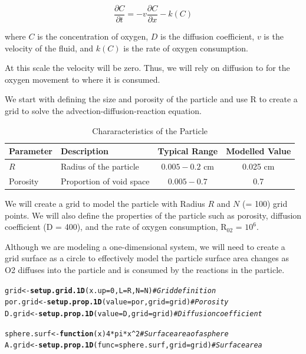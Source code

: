 \documentclass{tufte-handout}\usepackage[]{graphicx}\usepackage[]{xcolor}
\makeatletter
\newcommand{\hlnum}[1]{\textcolor[rgb]{0.686,0.059,0.569}{#1}}%
\newcommand{\hlcom}[1]{\textcolor[rgb]{0.678,0.584,0.686}{\textit{#1}}}%
\newcommand{\hlopt}[1]{\textcolor[rgb]{0,0,0}{#1}}%
\newcommand{\hlstd}[1]{\textcolor[rgb]{0.345,0.345,0.345}{#1}}%
\newcommand{\hlkwa}[1]{\textcolor[rgb]{0.161,0.373,0.58}{\textbf{#1}}}%
\newcommand{\hlkwb}[1]{\textcolor[rgb]{0.69,0.353,0.396}{#1}}%
\newcommand{\hlkwc}[1]{\textcolor[rgb]{0.333,0.667,0.333}{#1}}%
\newcommand{\hlkwd}[1]{\textcolor[rgb]{0.737,0.353,0.396}{\textbf{#1}}}%
\newenvironment{kframe}{%
 \def\at@end@of@kframe{}%
 \ifinner\ifhmode%
  \def\at@end@of@kframe{\end{minipage}}%
  \begin{minipage}{\columnwidth}%
 \fi\fi%
 \def\FrameCommand##1{\hskip\@totalleftmargin \hskip-\fboxsep
 \colorbox{shadecolor}{##1}\hskip-\fboxsep
     \hskip-\linewidth \hskip-\@totalleftmargin \hskip\columnwidth}%
 \MakeFramed {\advance\hsize-\width
   \@totalleftmargin\z@ \linewidth\hsize
   \@setminipage}}%
 {\par\unskip\endMakeFramed%
 \at@end@of@kframe}
\newenvironment{knitrout}{}{} %
\makeatother
\begin{document}
\[ \frac{\partial C}{\partial t} = -v \frac{\partial C}{\partial x} - k(C) \]

where \( C \) is the concentration of oxygen, \( D \) is the diffusion coefficient, \( v \) is the velocity of the fluid, and \( k(C) \) is the rate of oxygen consumption.

At this scale the velocity will be zero. Thus, we will rely on diffusion to for the oxygen movement to where it is consumed. 



We start with defining the size and porosity of the particle and use R to create a grid to solve the advection-diffusion-reaction equation.

\begin{table}[h]
\caption{Chararacteristics of the Particle}
\centering
\begin{tabular}{|l|l|c|c|} \hline
Parameter & Description & Typical Range &  Modelled Value \\ \hline\hline
\( R \) & Radius of the particle & \( 0.005-0.2 \) cm &  0.025 cm \\
Porosity & Proportion of void space & \(0.005-0.7\) &  0.7 \\ \hline
\end{tabular}
\end{table}

We will create a grid to model the particle with Radius \( R \) and \( N \) (= 100) grid points. We will also define the properties of the particle such as porosity, diffusion coefficient (D = 400), and the rate of oxygen consumption, R$_{02}$ = \ensuremath{10^{6}}.

Although we are modeling a one-dimensional system, we will need to create a grid surface as a circle to effectively model the particle surface area changes as O2 diffuses into the particle and is consumed by the reactions in the particle.

\begin{knitrout}
\color{fgcolor}\begin{kframe}
\begin{alltt}
\hlstd{grid} \hlkwb{<-} \hlkwd{setup.grid.1D}\hlstd{(}\hlkwc{x.up}\hlstd{=}\hlnum{0}\hlstd{,} \hlkwc{L} \hlstd{= R,} \hlkwc{N} \hlstd{= N)} \hlcom{# Grid definition}
\hlstd{por.grid} \hlkwb{<-} \hlkwd{setup.prop.1D}\hlstd{(}\hlkwc{value}\hlstd{=por,} \hlkwc{grid}\hlstd{=grid)} \hlcom{# Porosity}
\hlstd{D.grid} \hlkwb{<-} \hlkwd{setup.prop.1D}\hlstd{(}\hlkwc{value}\hlstd{=D,} \hlkwc{grid}\hlstd{=grid)} \hlcom{# Diffusion coefficient}

\hlstd{sphere.surf} \hlkwb{<-} \hlkwa{function}\hlstd{(}\hlkwc{x}\hlstd{)} \hlnum{4}\hlopt{*}\hlstd{pi}\hlopt{*}\hlstd{x}\hlopt{^}\hlnum{2} \hlcom{# Surface area of a sphere}
\hlstd{A.grid} \hlkwb{<-} \hlkwd{setup.prop.1D}\hlstd{(}\hlkwc{func}\hlstd{=sphere.surf,}  \hlkwc{grid}\hlstd{=grid)} \hlcom{# Surface area}
\end{alltt}
\end{kframe}
\end{knitrout}
\end{document}
